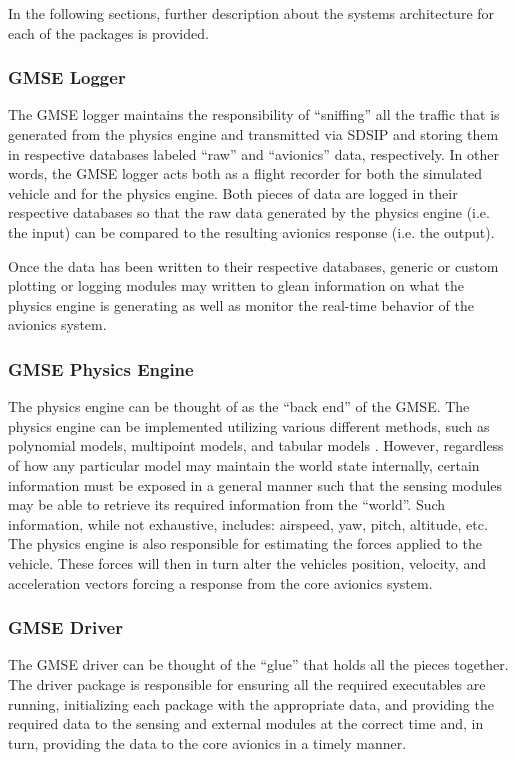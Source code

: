 In the following sections, further description about the systems architecture for each of the
packages is provided.

\subsubsection{GMSE Logger}

The GMSE logger maintains the responsibility of ``sniffing'' all the traffic that is generated from
the physics engine and transmitted via SDSIP and storing them in respective databases labeled
``raw'' and ``avionics'' data, respectively. In other words, the GMSE logger acts both as a flight
recorder for both the simulated vehicle and for the physics engine. Both pieces of data are logged
in their respective databases so that the raw data generated by the physics engine (i.e. the input)
can be compared to the resulting avionics response (i.e. the output).

Once the data has been written to their respective databases, generic or custom plotting or logging
modules may written to glean information on what the physics engine is generating as well as monitor
the real-time behavior of the avionics system.

\subsubsection{GMSE Physics Engine}

The physics engine can be thought of as the ``back end'' of the GMSE. The physics engine can be
implemented utilizing various different methods, such as polynomial models, multipoint models, and
tabular models \cite{banks_discussion_nodate}. However, regardless of how any particular model may
maintain the world state internally, certain information must be exposed in a general manner such
that the sensing modules may be able to retrieve its required information from the ``world''. Such
information, while not exhaustive, includes: airspeed, yaw, pitch, altitude, etc. The physics engine
is also responsible for estimating the forces applied to the vehicle. These forces will then in turn
alter the vehicles position, velocity, and acceleration vectors forcing a response from the core
avionics system.

\subsubsection{GMSE Driver}

The GMSE driver can be thought of the ``glue'' that holds all the pieces together. The driver
package is responsible for ensuring all the required executables are running, initializing each
package with the appropriate data, and providing the required data to the sensing and
external modules at the correct time and, in turn, providing the data to the core avionics in a
timely manner.

